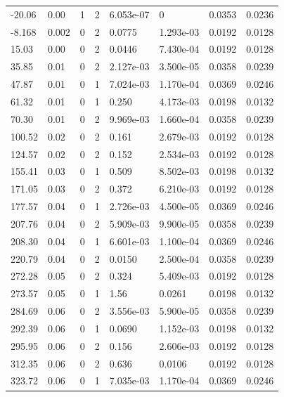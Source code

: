 \documentclass[preview]{standalone}
\begin{document}
{{\begin{tabular}{L{1.2cm}C{1.2cm} C{0.3cm}C{0.5cm} C{1.4cm}C{1.4cm} C{1.4cm}C{1.4cm}}
  -20.06  &  0.00  & 1     &  2 &  6.053e-07  & 0  & 0.0353 &  0.0236   \\ 
  -8.168  &  0.002  & 0     &  2 &  0.0775  & 1.293e-03  & 0.0192 &  0.0128   \\ 
  15.03  &  0.00  & 0     &  2 &  0.0446  & 7.430e-04  & 0.0192 &  0.0128   \\ 
  35.85  &  0.01  & 0     &  2 &  2.127e-03  & 3.500e-05  & 0.0358 &  0.0239   \\ 
  47.87  &  0.01  & 0     &  1 &  7.024e-03  & 1.170e-04  & 0.0369 &  0.0246   \\ 
  61.32  &  0.01  & 0     &  1 &  0.250  & 4.173e-03  & 0.0198 &  0.0132   \\ 
  70.30  &  0.01  & 0     &  2 &  9.969e-03  & 1.660e-04  & 0.0358 &  0.0239   \\ 
  100.52  &  0.02  & 0     &  2 &  0.161  & 2.679e-03  & 0.0192 &  0.0128   \\ 
  124.57  &  0.02  & 0     &  2 &  0.152  & 2.534e-03  & 0.0192 &  0.0128   \\ 
  155.41  &  0.03  & 0     &  1 &  0.509  & 8.502e-03  & 0.0198 &  0.0132   \\ 
  171.05  &  0.03  & 0     &  2 &  0.372  & 6.210e-03  & 0.0192 &  0.0128   \\ 
  177.57  &  0.04  & 0     &  1 &  2.726e-03  & 4.500e-05  & 0.0369 &  0.0246   \\ 
  207.76  &  0.04  & 0     &  2 &  5.909e-03  & 9.900e-05  & 0.0358 &  0.0239   \\ 
  208.30  &  0.04  & 0     &  1 &  6.601e-03  & 1.100e-04  & 0.0369 &  0.0246   \\ 
  220.79  &  0.04  & 0     &  2 &  0.0150  & 2.500e-04  & 0.0358 &  0.0239   \\ 
  272.28  &  0.05  & 0     &  2 &  0.324  & 5.409e-03  & 0.0192 &  0.0128   \\ 
  273.57  &  0.05  & 0     &  1 &  1.56  & 0.0261  & 0.0198 &  0.0132   \\ 
  284.69  &  0.06  & 0     &  2 &  3.556e-03  & 5.900e-05  & 0.0358 &  0.0239   \\ 
  292.39  &  0.06  & 0     &  1 &  0.0690  & 1.152e-03  & 0.0198 &  0.0132   \\ 
  295.95  &  0.06  & 0     &  2 &  0.156  & 2.606e-03  & 0.0192 &  0.0128   \\ 
  312.35  &  0.06  & 0     &  2 &  0.636  & 0.0106  & 0.0192 &  0.0128   \\ 
  323.72  &  0.06  & 0     &  1 &  7.035e-03  & 1.170e-04  & 0.0369 &  0.0246   \\ 

\end{tabular}}}
\end{document}
